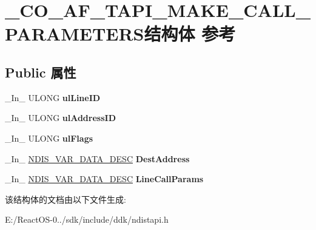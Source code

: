 \hypertarget{struct___c_o___a_f___t_a_p_i___m_a_k_e___c_a_l_l___p_a_r_a_m_e_t_e_r_s}{}\section{\+\_\+\+C\+O\+\_\+\+A\+F\+\_\+\+T\+A\+P\+I\+\_\+\+M\+A\+K\+E\+\_\+\+C\+A\+L\+L\+\_\+\+P\+A\+R\+A\+M\+E\+T\+E\+R\+S结构体 参考}
\label{struct___c_o___a_f___t_a_p_i___m_a_k_e___c_a_l_l___p_a_r_a_m_e_t_e_r_s}
\subsection*{Public 属性}
\begin{DoxyCompactItemize}
\item 
\mbox{\label{struct___c_o___a_f___t_a_p_i___m_a_k_e___c_a_l_l___p_a_r_a_m_e_t_e_r_s_a89a97a2de1a18b8cd2aa2be3c5934496}} 
\+\_\+\+In\+\_\+ U\+L\+O\+NG {\bfseries ul\+Line\+ID}
\item 
\mbox{\label{struct___c_o___a_f___t_a_p_i___m_a_k_e___c_a_l_l___p_a_r_a_m_e_t_e_r_s_a85a714429fd646c4af65f5aec9cf1cea}} 
\+\_\+\+In\+\_\+ U\+L\+O\+NG {\bfseries ul\+Address\+ID}
\item 
\mbox{\label{struct___c_o___a_f___t_a_p_i___m_a_k_e___c_a_l_l___p_a_r_a_m_e_t_e_r_s_a69d1cb57c1fe36973fbac6cc57b92cb1}} 
\+\_\+\+In\+\_\+ U\+L\+O\+NG {\bfseries ul\+Flags}
\item 
\mbox{\label{struct___c_o___a_f___t_a_p_i___m_a_k_e___c_a_l_l___p_a_r_a_m_e_t_e_r_s_ad4dcb61ac4ad834c3aea1b51ef696305}} 
\+\_\+\+In\+\_\+ \hyperlink{struct___n_d_i_s___v_a_r___d_a_t_a___d_e_s_c}{N\+D\+I\+S\+\_\+\+V\+A\+R\+\_\+\+D\+A\+T\+A\+\_\+\+D\+E\+SC} {\bfseries Dest\+Address}
\item 
\mbox{\label{struct___c_o___a_f___t_a_p_i___m_a_k_e___c_a_l_l___p_a_r_a_m_e_t_e_r_s_ae1379814bafc12f69fa4538f7d516e00}} 
\+\_\+\+In\+\_\+ \hyperlink{struct___n_d_i_s___v_a_r___d_a_t_a___d_e_s_c}{N\+D\+I\+S\+\_\+\+V\+A\+R\+\_\+\+D\+A\+T\+A\+\_\+\+D\+E\+SC} {\bfseries Line\+Call\+Params}
\end{DoxyCompactItemize}


该结构体的文档由以下文件生成\+:\begin{DoxyCompactItemize}
\item 
E\+:/\+React\+O\+S-\/0../sdk/include/ddk/ndistapi.\+h\end{DoxyCompactItemize}
